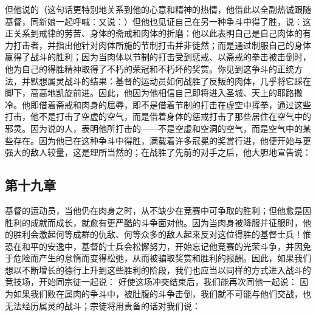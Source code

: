 但他说的（这句话更特别地关系到他的心意和精神的热情，他借此以全副热诚跟随基督，同新娘一起呼喊：又说：）但他也见证自己在另一种争斗中得了胜，说：这正关系到戒律的劳苦、身体的斋戒和肉体的折磨：他以此表明自己是自己肉体的有力打击者，并指出他针对肉体所施的节制打击并非徒然；而是通过制服自己的身体赢得了战斗的胜利；因为当肉体以节制的打击受到惩戒、以斋戒的拳击被击倒时，他为自己的得胜精神取得了不朽的荣冠和不朽坏的奖赏。你见到这争斗的正统方法，并默想属灵战斗的结果：基督的运动员如何战胜了反叛的肉体，几乎将它踩在脚下，高高地凯旋前进。因此，他因为他相信自己即将进入圣城、天上的耶路撒冷。他即借着斋戒和肉身的屈辱，即不是借着节制的打击在虚空中挥拳，通过这些打击，他不是打击了空虚的空气，而是借着身体的惩戒打击了那些居住在空气中的邪灵。因为说的人，表明他所打击的——不是空虚和空洞的空气，而是空气中的某些存在。因为他已在这种争斗中得胜，满载着许多冠冕的奖赏行进，他便开始与更强大的敌人较量，这是理所当然的；在战胜了先前的对手之后，他大胆地宣告说：\par


\subsection{第十九章}

\par

基督的运动员，当他仍在肉身之时，从不缺少在竞赛中可争取的胜利；但他愈是因胜利的成就而成长，就愈有更严酷的斗争面对他。因为当肉身被降服并征服时，他的胜利会激起何等成群的仇敌、何等众多的敌人起来反对这位得胜的基督士兵！惟恐在和平的安逸中，基督的士兵会松懈努力，开始忘记他竞赛的光荣斗争，并因免于危险而产生的怠惰而变得松弛，从而被骗取奖赏和胜利的报酬。因此，如果我们想以不断增长的德行上升到这些胜利的阶段，我们也应当以同样的方式进入战斗的竞技场，开始同宗徒一起说：  好使这场冲突结束后，我们能再次同他一起说：  因为如果我们败在属肉的争斗中，被肚腹的斗争击倒，我们就不可能与他们交战，也无法经历属灵的战斗；宗徒将用责备的话对我们说： \par


